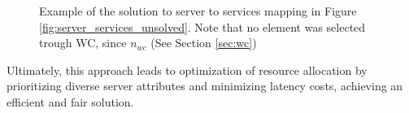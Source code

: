         \begin{figure}[!ht]
            \centering
            
            \caption{Example of the solution to server to services mapping in Figure \ref{fig:server_services_unsolved}. Note that no element was selected trough WC, since $n_{wc}$ (See Section \ref{sec:wc})}
            \label{fig:server_services_solved}
        \end{figure}
        
        Ultimately, this approach leads to optimization of resource allocation by prioritizing diverse server attributes and minimizing latency costs, achieving an efficient and fair solution.

